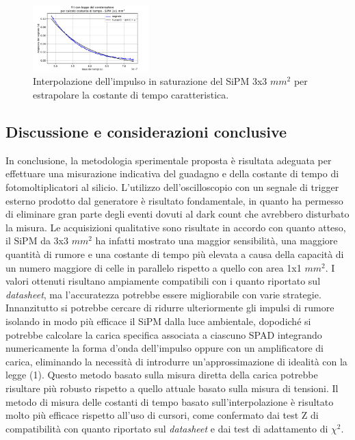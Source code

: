 \documentclass[journal]{IEEEtran}
\begin{document}
\begin{figure}[H]%
\begin{center}
\includegraphics[width=0.40\textwidth]{analysis/output/SiPM_fit_1mm.pdf}
\caption{Interpolazione dell'impulso in saturazione del SiPM 3x3 $mm^2$ per estrapolare la costante di tempo caratteristica.}
\label{fig:fit3m}
\end{center}
\end{figure}

\subsection{Discussione e considerazioni conclusive}
In conclusione, la metodologia sperimentale proposta è risultata adeguata per effettuare una misurazione indicativa del guadagno e della costante di tempo di fotomoltiplicatori al silicio. L'utilizzo dell'oscilloscopio con un segnale di trigger esterno prodotto dal generatore è risultato fondamentale, in quanto ha permesso di eliminare gran parte degli eventi dovuti al dark count che avrebbero disturbato la misura. Le acquisizioni qualitative sono risultate in accordo con quanto atteso, il SiPM da 3x3 $mm^2$ ha infatti mostrato una maggior sensibilità, una maggiore quantità di rumore e una costante di tempo più elevata a causa della capacità di un numero maggiore di celle in parallelo  rispetto a quello con area 1x1 $mm^2$. I valori ottenuti risultano ampiamente compatibili con i quanto riportato sul \textit{datasheet}, ma l'accuratezza potrebbe essere migliorabile con varie strategie. Innanzitutto si potrebbe cercare di ridurre ulteriormente gli impulsi di rumore isolando in modo più efficace il SiPM dalla luce ambientale, dopodiché si potrebbe calcolare la carica specifica associata a ciascuno SPAD integrando numericamente la forma d'onda dell'impulso oppure con un amplificatore di carica, eliminando la necessità di introdurre un'approssimazione di idealità con la legge (1). Questo metodo basato sulla misura diretta della carica potrebbe risultare più robusto rispetto a quello attuale basato sulla misura di tensioni. Il metodo di misura delle costanti di tempo basato sull'interpolazione è risultato molto più efficace rispetto all'uso di cursori, come confermato dai test Z di compatibilità con quanto riportato sul \textit{datasheet} e dai test di adattamento di $\chi^2$.
\end{document}

